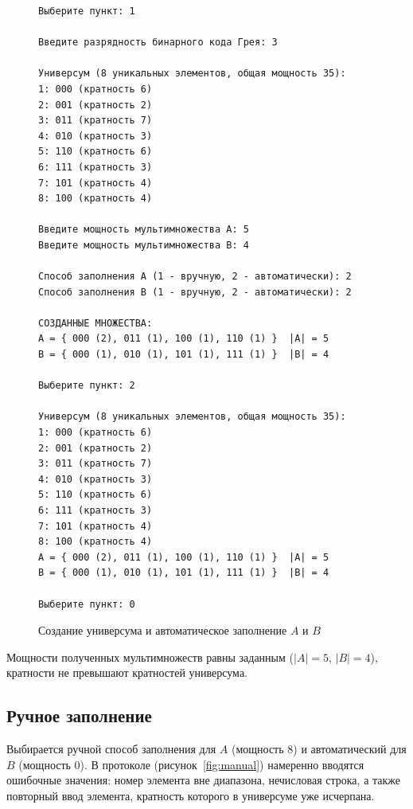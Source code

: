 \documentclass[14pt,a4paper]{extreport}
\newcommand{\card}[1]{\left|#1\right|}
\begin{document}
\begin{figure}[H]
\begin{lstlisting}[numbers=none,frame=single]
Выберите пункт: 1

Введите разрядность бинарного кода Грея: 3

Универсум (8 уникальных элементов, общая мощность 35):
1: 000 (кратность 6)
2: 001 (кратность 2)
3: 011 (кратность 7)
4: 010 (кратность 3)
5: 110 (кратность 6)
6: 111 (кратность 3)
7: 101 (кратность 4)
8: 100 (кратность 4)

Введите мощность мультимножества A: 5
Введите мощность мультимножества B: 4

Способ заполнения A (1 - вручную, 2 - автоматически): 2
Способ заполнения B (1 - вручную, 2 - автоматически): 2

СОЗДАННЫЕ МНОЖЕСТВА:
A = { 000 (2), 011 (1), 100 (1), 110 (1) }  |A| = 5
B = { 000 (1), 010 (1), 101 (1), 111 (1) }  |B| = 4

Выберите пункт: 2

Универсум (8 уникальных элементов, общая мощность 35):
1: 000 (кратность 6)
2: 001 (кратность 2)
3: 011 (кратность 7)
4: 010 (кратность 3)
5: 110 (кратность 6)
6: 111 (кратность 3)
7: 101 (кратность 4)
8: 100 (кратность 4)
A = { 000 (2), 011 (1), 100 (1), 110 (1) }  |A| = 5
B = { 000 (1), 010 (1), 101 (1), 111 (1) }  |B| = 4

Выберите пункт: 0
\end{lstlisting}
\caption{Создание универсума и автоматическое заполнение $A$ и $B$}\label{fig:auto}
\end{figure}

Мощности полученных мультимножеств равны заданным ($\card{A}=5$, $\card{B}=4$), кратности не превышают кратностей универсума.

\subsection{Ручное заполнение}

Выбирается ручной способ заполнения для $A$ (мощность 8) и автоматический для $B$ (мощность 0). В протоколе (рисунок~\ref{fig:manual}) намеренно вводятся ошибочные значения: номер элемента вне диапазона, нечисловая строка, а также повторный ввод элемента, кратность которого в универсуме уже исчерпана.
\end{document}

